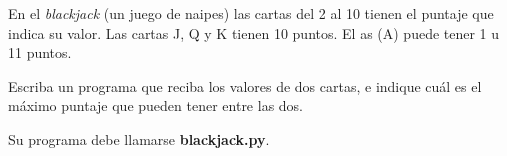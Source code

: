 \documentclass[12pt,spanish,letterpaper]{article}
\begin{document}
  En el \emph{blackjack} (un juego de naipes)
  las cartas del 2 al 10 tienen el puntaje que indica su valor.
  Las cartas J, Q y K tienen 10 puntos.
  El as (A) puede tener 1 u 11 puntos.

  Escriba un programa que reciba los valores de dos cartas,
  e indique cuál es el máximo puntaje que pueden tener entre las dos.

  \begin{minipage}[t]{.5\textwidth}
    
  \end{minipage}
  
  \begin{minipage}[t]{.5\textwidth}
    
  \end{minipage}

  Su programa debe llamarse \textbf{blackjack.py}.
\end{document}
